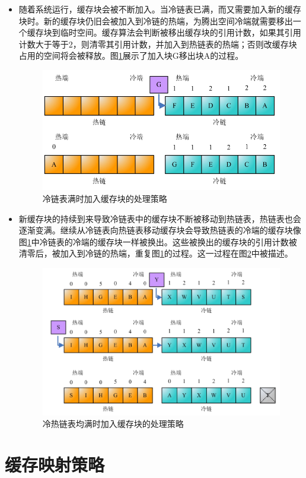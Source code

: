 \begin{enumerate}
\begin{itemize}
\item
随着系统运行，缓存块会被不断加入。当冷链表已满，而又需要加入新的缓存块时。新的缓存块仍旧会被加入到冷链的热端，为腾出空间冷端就需要移出一个缓存块到临时空间。缓存算法会判断被移出缓存块的引用计数，如果其引用计数大于等于2，则清零其引用计数，并加入到热链表的热端；否则改缓存块占用的空间将会被释放。图\ref{fig:replace-algo-3}展示了加入块G移出块A的过程。
\begin{figure}[htb]
\centering
\includegraphics[width=0.6\linewidth]{./graph/replace-algo-3}
\caption{冷链表满时加入缓存块的处理策略}
\label{fig:replace-algo-3}
\end{figure}

\item
新缓存块的持续到来导致冷链表中的缓存块不断被移动到热链表，热链表也会逐渐变满。继续从冷链表向热链表移动缓存块会导致热链表的冷端的缓存块像图\ref{fig:replace-algo-3}中冷链表的冷端的缓存块一样被换出。这些被换出的缓存块的引用计数被清零后，被加入到冷链的热端，重复图\ref{fig:replace-algo-3}的过程。这一过程在图\ref{fig:replace-algo-4}中被描述。
\begin{figure}[htb]
\centering
\includegraphics[width=0.7\linewidth]{./graph/replace-algo-4}
\caption{冷热链表均满时加入缓存块的处理策略}
\label{fig:replace-algo-4}
\end{figure}
\end{itemize}

\end{enumerate}

\section{缓存映射策略}
\label{sec:cache_mapping}


